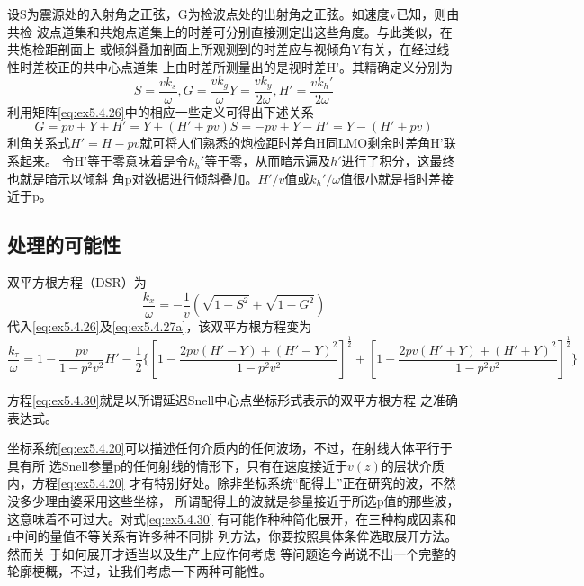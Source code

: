 设S为震源处的入射角之正弦，G为检波点处的出射角之正弦。如速度v已知，则由共检
波点道集和共炮点道集上的时差可分别直接测定出这些角度。与此类似，在共炮检距剖面上
或倾斜叠加剖面上所观测到的时差应与视倾角Y有关，在经过线性时差校正的共中心点道集
上由时差所测量出的是视时差H'。其精确定义分别为
\begin{subequations}
\begin{equation}
S=\frac{vk_s}{\omega}, G=\frac{vk_g}{\omega}
\label{eq:ex5.4.27a}
\end{equation}
\begin{equation}
Y=\frac{vk_y}{2\omega}, H'=\frac{vk_h'}{2\omega}
\label{eq:ex5.4.27b}
\end{equation}
\label{eq:ex5.4.27}
\end{subequations}
利用矩阵\ref{eq:ex5.4.26}中的相应一些定义可得出下述关系
\begin{subequations}
\begin{equation}
G=pv+Y+H'=Y+(H'+pv)
\label{eq:ex5.4.28a}
\end{equation}
\begin{equation}
S=-pv+Y-H'=Y-(H'+pv)
\label{eq:ex5.4.28b}
\end{equation}
\label{eq:ex5.4.28}
\end{subequations}
利角关系式$H'=H-pv$就可将人们熟悉的炮检距时差角H同LMO剩余时差角H'联系起来。
令H'等于零意味着是令$k_h'$等于零，从而暗示遍及$h'$进行了积分，这最终也就是暗示以倾斜
角p对数据进行倾斜叠加。$H'/v$值或$k_h'/\omega$值很小就是指时差接近于p。


\subsection{处理的可能性}
\label{sec:5.4.4}

双平方根方程（DSR）为
\begin{equation}
\frac{k_x}{\omega}=-\frac{1}{v}(\sqrt{1-S^2}+\sqrt{1-G^2})
\label{eq:ex5.4.29}
\end{equation}
代入\ref{eq:ex5.4.26}及\ref{eq:ex5.4.27a}，该双平方根方程变为
\begin{equation}
\frac{k_\tau}{\omega}=1-\frac{pv}{1-p^2v^2}H'-\frac{1}{2}\{
[1-\frac{2pv(H'-Y)+(H'-Y)^2}{1-p^2v^2}]^\frac{1}{2}+
[1-\frac{2pv(H'+Y)+(H'+Y)^2}{1-p^2v^2}]^\frac{1}{2}\}
\label{eq:ex5.4.30}
\end{equation}

方程\ref{eq:ex5.4.30}就是以所谓延迟Snell中心点坐标形式表示的双平方根方程
之准确表达式。

坐标系统\ref{eq:ex5.4.20}可以描述任何介质内的任何波场，不过，在射线大体平行于具有所
选Snell参量p的任何射线的情形下，只有在速度接近于$v(z)$的层状介质内，方程\ref{eq:ex5.4.20}
才有特别好处。除非坐标系统“配得上”正在研究的波，不然没多少理由婆采用这些坐榇，
所谓配得上的波就是参量接近于所选p值的那些波，这意味着不可过大。对式\ref{eq:ex5.4.30}
有可能作种种简化展开，在三种构成因素和r中间的量值不等关系有许多种不同排
列方法，你要按照具体条侔选取展开方法。然而关
于如何展开才适当以及生产上应作何考虑
等问题迄今尚说不出一个完整的轮廓梗概，不过，让我们考虑一下两种可能性。

